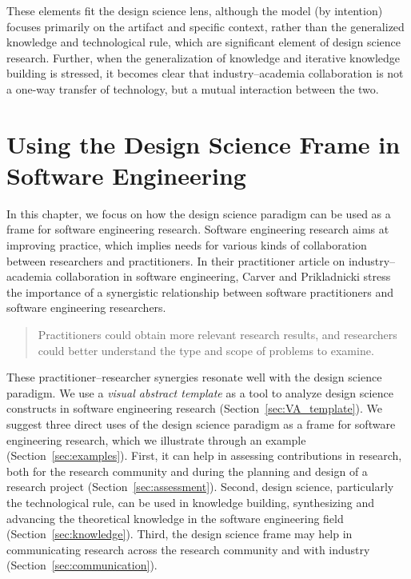 \documentclass[graybox]{svmult}
\begin{document}
These elements fit the design science lens, although the model (by intention) focuses primarily on the artifact and specific context, rather than the generalized knowledge and technological rule, which are significant element of design science research. Further, when the generalization of knowledge and iterative knowledge building is stressed, it becomes clear that industry--academia collaboration is not a one-way transfer of technology, but a mutual interaction between the two.


\section{Using the Design Science Frame in Software Engineering}
\label{sec:UsingDSinSE}


In this chapter, we focus on how the design science paradigm can be used as a frame for software engineering research. Software engineering research aims at improving practice, which implies needs for various kinds of collaboration between researchers and practitioners. In their practitioner article on industry--academia collaboration in software engineering, Carver and Prikladnicki stress the importance of a synergistic relationship between software practitioners and software engineering researchers.
\begin{quote}Practitioners could obtain more relevant research results, and researchers could better understand the type and scope of problems to examine.~\cite{CarverIEEESW2018}
\end{quote} 

These practitioner--researcher synergies resonate well with the design science paradigm.  We use a \emph{visual abstract template} as a tool to analyze design science constructs in software engineering research (Section~\ref{sec:VA_template}). We suggest three direct uses of the design science paradigm as a frame for software engineering research, which we illustrate through an example (Section~\ref{sec:examples}). First, it can help in assessing contributions in research, both for the research community and during the planning and design of a research project (Section~\ref{sec:assessment}). Second, design science, particularly the technological rule, can be used in knowledge building, synthesizing and advancing the theoretical knowledge in the software engineering field (Section~\ref{sec:knowledge}). Third, the design science frame may help in communicating research across the research community and with industry (Section~\ref{sec:communication}). 
\end{document}
